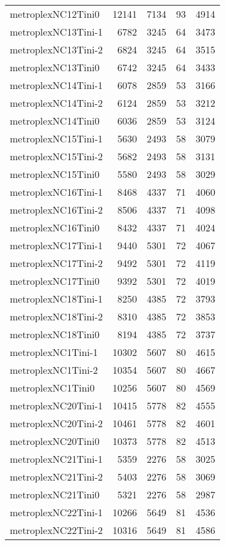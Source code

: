 \begin{longtable}{lrrrr}
metroplexNC12Tini0 & 12141 & 7134 & 93 & 4914 \\
metroplexNC13Tini-1 & 6782 & 3245 & 64 & 3473 \\
metroplexNC13Tini-2 & 6824 & 3245 & 64 & 3515 \\
metroplexNC13Tini0 & 6742 & 3245 & 64 & 3433 \\
metroplexNC14Tini-1 & 6078 & 2859 & 53 & 3166 \\
metroplexNC14Tini-2 & 6124 & 2859 & 53 & 3212 \\
metroplexNC14Tini0 & 6036 & 2859 & 53 & 3124 \\
metroplexNC15Tini-1 & 5630 & 2493 & 58 & 3079 \\
metroplexNC15Tini-2 & 5682 & 2493 & 58 & 3131 \\
metroplexNC15Tini0 & 5580 & 2493 & 58 & 3029 \\
metroplexNC16Tini-1 & 8468 & 4337 & 71 & 4060 \\
metroplexNC16Tini-2 & 8506 & 4337 & 71 & 4098 \\
metroplexNC16Tini0 & 8432 & 4337 & 71 & 4024 \\
metroplexNC17Tini-1 & 9440 & 5301 & 72 & 4067 \\
metroplexNC17Tini-2 & 9492 & 5301 & 72 & 4119 \\
metroplexNC17Tini0 & 9392 & 5301 & 72 & 4019 \\
metroplexNC18Tini-1 & 8250 & 4385 & 72 & 3793 \\
metroplexNC18Tini-2 & 8310 & 4385 & 72 & 3853 \\
metroplexNC18Tini0 & 8194 & 4385 & 72 & 3737 \\
metroplexNC1Tini-1 & 10302 & 5607 & 80 & 4615 \\
metroplexNC1Tini-2 & 10354 & 5607 & 80 & 4667 \\
metroplexNC1Tini0 & 10256 & 5607 & 80 & 4569 \\
metroplexNC20Tini-1 & 10415 & 5778 & 82 & 4555 \\
metroplexNC20Tini-2 & 10461 & 5778 & 82 & 4601 \\
metroplexNC20Tini0 & 10373 & 5778 & 82 & 4513 \\
metroplexNC21Tini-1 & 5359 & 2276 & 58 & 3025 \\
metroplexNC21Tini-2 & 5403 & 2276 & 58 & 3069 \\
metroplexNC21Tini0 & 5321 & 2276 & 58 & 2987 \\
metroplexNC22Tini-1 & 10266 & 5649 & 81 & 4536 \\
metroplexNC22Tini-2 & 10316 & 5649 & 81 & 4586 \\

\end{longtable}
